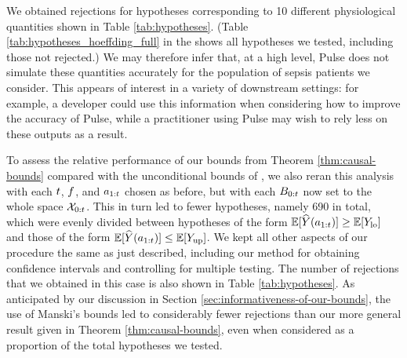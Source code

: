 
We obtained rejections for hypotheses corresponding to 10 different physiological quantities shown in Table \ref{tab:hypotheses}.
(Table \ref{tab:hypotheses_hoeffding_full} in the \AppendixName shows all hypotheses we tested, including those not rejected.)
We may therefore infer that, at a high level, Pulse does not simulate these quantities accurately for the population of sepsis patients we consider.
This appears of interest in a variety of downstream settings: for example, a developer could use this information when considering how to improve the accuracy of Pulse, while a practitioner using Pulse may wish to rely less on these outputs as a result.


To assess the relative performance of our bounds from Theorem \ref{thm:causal-bounds} compared with the unconditional bounds of \citet{manski}, we also reran this analysis with each $t$, $f$, and $a_{1:t}$ chosen as before, but with each $B_{0:t}$ now set to the whole space $\mathcal{X}_{0:t}$.
This in turn led to fewer hypotheses, namely 690 in total, which were evenly divided between hypotheses of the form $\mathbb{E}[\widehat{Y}(a_{1:t})] \geq \mathbb{E}[Y_{\mathrm{lo}}]$ and those of the form $\mathbb{E}[\widehat{Y}(a_{1:t})] \leq \mathbb{E}[Y_{\mathrm{up}}]$.
We kept all other aspects of our procedure the same as just described, including our method for obtaining confidence intervals and controlling for multiple testing.
The number of rejections that we obtained in this case is also shown in Table \ref{tab:hypotheses}.
As anticipated by our discussion in Section \ref{sec:informativeness-of-our-bounds}, the use of Manski's bounds led to considerably fewer rejections than our more general result given in Theorem \ref{thm:causal-bounds}, even when considered as a proportion of the total hypotheses we tested.

